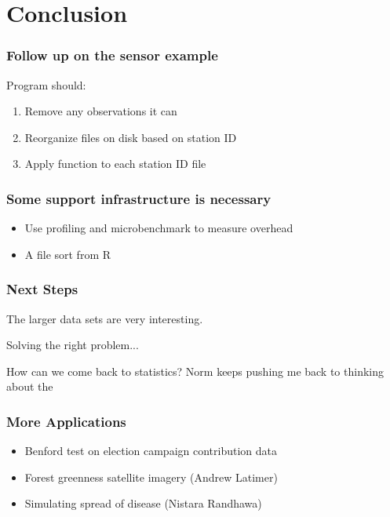 \documentclass{beamer}
\begin{document}
\section{Conclusion}

\begin{frame}

    \frametitle{Follow up on the sensor example}

    Program should:

\begin{enumerate}
    \item Remove any observations it can
    \item Reorganize files on disk based on station ID
    \item Apply function to each station ID file
\end{enumerate}

\end{frame}
\begin{frame}

    \frametitle{Some support infrastructure is necessary}

\begin{itemize}
\item Use profiling and microbenchmark to measure overhead
\item A file sort from R
\end{itemize}


\end{frame}
\begin{frame}

    \frametitle{Next Steps}

    The larger data sets are very interesting. 

    Solving the right problem...
    
    How can we come back
    to statistics? Norm keeps pushing me back to thinking about the 

\end{frame}
\begin{frame}

    \frametitle{More Applications}

\begin{itemize}
    \item Benford test on election campaign contribution data
    \item Forest greenness satellite imagery (Andrew Latimer)
    \item Simulating spread of disease (Nistara Randhawa)
\end{itemize}

\end{frame}
\end{document}
